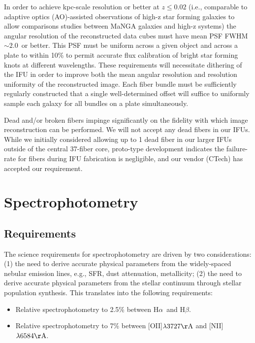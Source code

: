 \documentclass[preprint,11pt]{aastex}
\newcommand{\Halpha}{{H$\alpha$}}
\newcommand{\Hbeta}{{H$\beta$}}
\begin{document}
In order to achieve kpc-scale resolution or better at $z\leq0.02$
(i.e., comparable to adaptive optics (AO)-assisted observations of
high-z star forming galaxies to allow comparisons studies between
MaNGA galaxies and high-z systems) the angular resolution of the
reconstructed data cubes must have mean PSF FWHM $\sim 2.0$\arcsec\ or
better. This PSF must be uniform across a given object and across a
plate to within 10\% to permit accurate flux calibration of bright
star forming knots at different wavelengths.  These requirements will
necessitate dithering of the IFU in order to improve both the mean
angular resolution and resolution uniformity of the reconstructed
image. Each fiber bundle must be sufficiently regularly constructed
that a single well-determined offset will suffice to uniformly sample
each galaxy for all bundles on a plate simultaneously.

Dead and/or broken fibers impinge significantly on the fidelity with
which image reconstruction can be performed. We will not accept any
dead fibers in our IFUs. While we initially considered allowing up to
1 dead fiber in our larger IFUs outside of the central 37-fiber core,
proto-type development indicates the failure-rate for fibers during
IFU fabrication is negligible, and our vendor (CTech) has accepted our
requirement.

\section{Spectrophotometry} \label{sec:spectrophotometry}

\subsection{Requirements}

The science requirements for spectrophotometry are driven by two
considerations: (1) the need to derive accurate physical parameters
from the widely-spaced nebular emission lines, e.g., SFR, dust
attenuation, metallicity; (2) the need to derive accurate physical
parameters from the stellar continuum through stellar population
synthesis. This translates into the following requirements:

\begin{itemize}
\item Relative spectrophotometry to 2.5\% between \Halpha\ and \Hbeta.
\item Relative spectrophotometry to 7\% between [OII]$\lambda3727{\rm \AA}$ and [NII]$\lambda6584{\rm \AA}$. 
\end{itemize}
\end{document}
